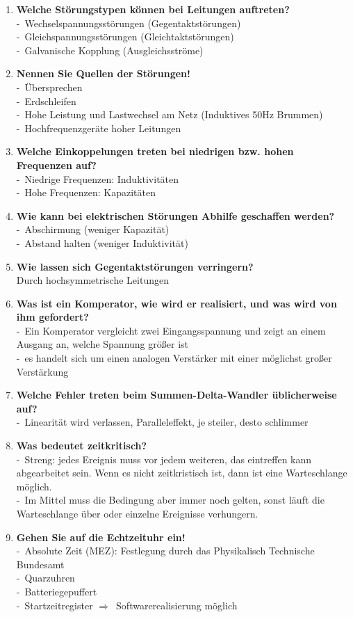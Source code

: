 \documentclass[a4paper,12pt]{article}
\newcommand{\questionnopage}[2]{\pagebreak[3]\item {\textbf{#1?}}#2}
\newcommand{\statementnopage}[2]{\pagebreak[3]\item {\textbf{#1!}}#2}
\newcommand{\catchword}[1]{\\-\ #1}
\newcommand{\normaltext}[1]{\\#1}
\newcommand{\resultol}[1]{$\Rightarrow$\ #1}
\begin{document}
\begin{enumerate}
  \questionnopage{Welche Störungstypen können bei Leitungen auftreten}
  {
    \catchword{Wechselspannungsstörungen (Gegentaktstörungen)}
    \catchword{Gleichspannungsstörungen (Gleichtaktstörungen)}
    \catchword{Galvanische Kopplung (Ausgleichsströme)}
  }

  \statementnopage{Nennen Sie Quellen der Störungen}
  {
    \catchword{Übersprechen}
    \catchword{Erdschleifen}
    \catchword{Hohe Leistung und Lastwechsel am Netz (Induktives 50Hz Brummen)}
    \catchword{Hochfrequenzgeräte hoher Leitungen}
  }

  \questionnopage{Welche Einkoppelungen treten bei niedrigen bzw. hohen Frequenzen auf}
  {
    \catchword{Niedrige Frequenzen: Induktivitäten}
    \catchword{Hohe Frequenzen: Kapazitäten}
  }

  \questionnopage{Wie kann bei elektrischen Störungen Abhilfe geschaffen werden}
  {
    \catchword{Abschirmung (weniger Kapazität)}
    \catchword{Abstand halten (weniger Induktivität)}
  }

  \questionnopage{Wie lassen sich Gegentaktstörungen verringern}
  {
    \normaltext{Durch hochsymmetrische Leitungen}
  }

  \questionnopage{Was ist ein Komperator, wie wird er realisiert, und was wird von 
                  ihm gefordert}
  {
    \catchword{Ein Komperator vergleicht zwei Eingangsspannung 
               und zeigt an einem Ausgang an, welche Spannung größer ist}
    \catchword{es handelt sich um einen analogen Verstärker mit einer möglichst
               großer Verstärkung}
  }

  \questionnopage{Welche Fehler treten beim Summen-Delta-Wandler üblicherweise auf}
  {
    \catchword{Linearität wird verlassen, Paralleleffekt, je steiler, desto schlimmer}
  }

  \questionnopage{Was bedeutet zeitkritisch}
  {
   \catchword{Streng: jedes Ereignis muss vor jedem weiteren, das eintreffen kann
              abgearbeitet sein. Wenn es nicht zeitkristisch ist, dann ist eine Warteschlange
              möglich.}
   \catchword{Im Mittel muss die Bedingung aber immer noch gelten, sonst läuft
              die Warteschlange über oder einzelne Ereignisse verhungern.}
  }

  \statementnopage{Gehen Sie auf die Echtzeituhr ein}
  {
    \catchword{Absolute Zeit (MEZ): Festlegung durch das Physikalisch Technische Bundesamt}
    \catchword{Quarzuhren}
    \catchword{Batteriegepuffert}
    \catchword{Startzeitregister \resultol{Softwarerealisierung möglich}}
  }


\end{enumerate}
\end{document}
